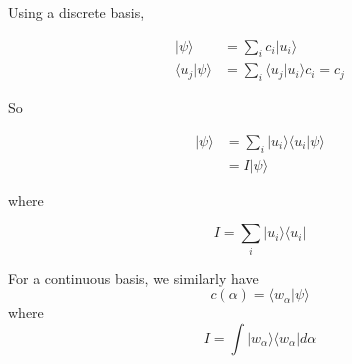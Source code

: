 \documentclass[12pt]{article}
\begin{document}
Using a discrete basis,

\begin{align*}
    |\psi\rangle &= \sum_i c_i|u_i\rangle \\
    \langle u_j|\psi\rangle &= \sum_i \langle u_j|u_i \rangle c_i = c_j
\end{align*}

So

\begin{align*}
    |\psi\rangle &= \sum_i |u_i\rangle\langle u_i|\psi\rangle \\
                 &= I|\psi\rangle
\end{align*}

where

$$I = \sum_i |u_i\rangle\langle u_i |$$

For a continuous basis, we similarly have
$$c(\alpha) = \langle w_\alpha|\psi\rangle$$
where
$$I = \int|w_\alpha\rangle\langle w_\alpha| d\alpha$$
\end{document}
